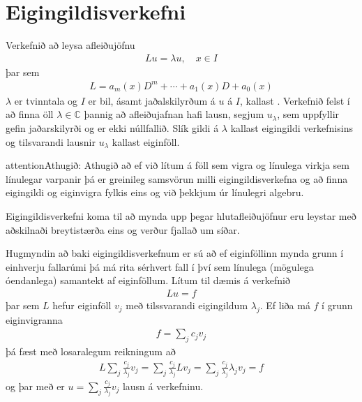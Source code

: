 \documentclass[a4paper,10pt,icelandic]{sphinxmanual}
\begin{document}
\section{Eigingildisverkefni}
\label{\detokenize{Kafli03:id1}}
Verkefnið að leysa afleiðujöfnu
\begin{equation*}
\begin{split}Lu = \lambda u, \quad x\in I\end{split}
\end{equation*}
þar sem
\begin{equation*}
\begin{split}L = a_m(x) D^m + \cdots + a_1(x) D + a_0(x)\end{split}
\end{equation*}
\(\lambda\) er tvinntala og \(I\) er bil, ásamt jaðalskilyrðum á \(u\) á \(I\), kallast . Verkefnið felst í að finna öll \(\lambda \in \mathbb{C}\) þannig að afleiðujafnan hafi lausn, segjum \(u_\lambda\), sem uppfyllir gefin jaðarskilyrði og er ekki núllfallið. Slík gildi á \(\lambda\) kallast eigingildi verkefnisins og tilsvarandi lausnir \(u_\lambda\) kallast eiginföll.

\begin{sphinxadmonition}{attention}{Athugið:}
Athugið að ef við lítum á föll sem vigra og línulega virkja sem línulegar varpanir þá er greinileg samsvörun milli eigingildisverkefna og að finna eigingildi og eiginvigra fylkis eins og við þekkjum úr línulegri algebru.
\end{sphinxadmonition}

Eigingildisverkefni koma til að mynda upp þegar hlutafleiðujöfnur eru leystar með aðskilnaði breytistærða eins og verður fjallað um síðar.

Hugmyndin að baki eigingildisverkefnum er sú að ef eiginföllinn mynda grunn í einhverju fallarúmi þá má rita sérhvert fall í því sem línulega (mögulega óendanlega) samantekt af eiginföllum. Lítum til dæmis á verkefnið
\begin{equation*}
\begin{split}Lu = f\end{split}
\end{equation*}
þar sem \(L\) hefur eiginföll \(v_j\) með tilssvarandi eigingildum \(\lambda_j\). Ef liða má \(f\) í grunn eiginvigranna
\begin{equation*}
\begin{split}f = \sum_{j} c_j v_j\end{split}
\end{equation*}
þá fæst með losaralegum reikningum að
\begin{equation*}
\begin{split}L \sum_{j} \frac{c_j}{\lambda_j} v_j =  \sum_{j} \frac{c_j}{\lambda_j} L v_j  = \sum_{j} \frac{c_j}{\lambda_j} \lambda_j v_j = f\end{split}
\end{equation*}
og þar með er \(u = \sum_{j} \frac{c_j}{\lambda_j} v_j\) lausn á verkefninu.
\end{document}
